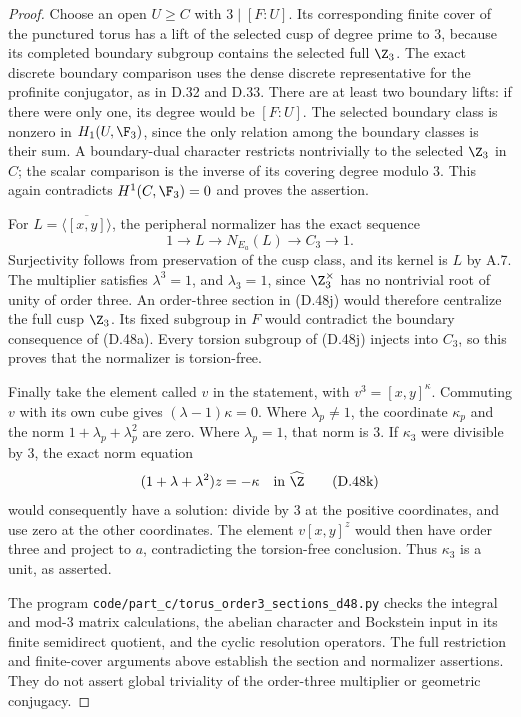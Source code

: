 \begin{proof}
Choose an open $U\geq C$ with $3\mid[F:U]$.
Its corresponding finite cover of the punctured
torus has a lift of the selected cusp of degree
prime to $3$, because its completed boundary
subgroup contains the selected full $\Z_3$.
The exact discrete boundary comparison uses
the dense discrete representative for the
profinite conjugator, as in D.32 and D.33.
There are at least two boundary lifts: if there
were only one, its degree would be $[F:U]$.
The selected boundary class is nonzero in
$H_1(U,\F_3)$, since the only relation among
the boundary classes is their sum.
A boundary-dual character restricts nontrivially
to the selected $\Z_3$ in $C$; the scalar
comparison is the inverse of its covering
degree modulo $3$.
This again contradicts $H^1(C,\F_3)=0$ and proves
the assertion.

For $L=\overline{\langle[x,y]\rangle}$, the
peripheral normalizer has the exact sequence
\[
           1\longrightarrow L\longrightarrow N_{E_a}(L)
                    \longrightarrow C_3\longrightarrow1.
                                                        \tag{D.48j}
\]
Surjectivity follows from preservation of the cusp
class, and its kernel is $L$ by A.7.
The multiplier satisfies $\lambda^3=1$, and
$\lambda_3=1$, since $\Z_3^\times$ has no
nontrivial root of unity of order three.
An order-three section in (D.48j) would therefore
centralize the full cusp $\Z_3$.
Its fixed subgroup in $F$ would contradict the
boundary consequence of (D.48a).
Every torsion subgroup of (D.48j) injects into
$C_3$, so this proves that the normalizer is
torsion-free.

Finally take the element called $v$ in the
statement, with $v^3=[x,y]^\kappa$.
Commuting $v$ with its own cube gives
$(\lambda-1)\kappa=0$.
Where $\lambda_p\ne1$, the coordinate $\kappa_p$
and the norm $1+\lambda_p+\lambda_p^2$ are zero.
Where $\lambda_p=1$, that norm is $3$.
If $\kappa_3$ were divisible by $3$, the exact
norm equation
\[
                (1+\lambda+\lambda^2)z=-\kappa
                               \quad\text{in }\widehat\Z
                                                        \tag{D.48k}
\]
would consequently have a solution: divide by
$3$ at the positive coordinates, and use zero
at the other coordinates.
The element $v[x,y]^z$ would then have order
three and project to $a$, contradicting the
torsion-free conclusion.
Thus $\kappa_3$ is a unit, as asserted.

The program
\texttt{code/part\_c/torus\_order3\_sections\_d48.py}
checks the integral and mod-$3$ matrix calculations,
the abelian character and Bockstein input in its
finite semidirect quotient, and the cyclic
resolution operators.
The full restriction and finite-cover arguments
above establish the section and normalizer
assertions.  They do not assert global triviality
of the order-three multiplier or geometric
conjugacy.
\end{proof}
